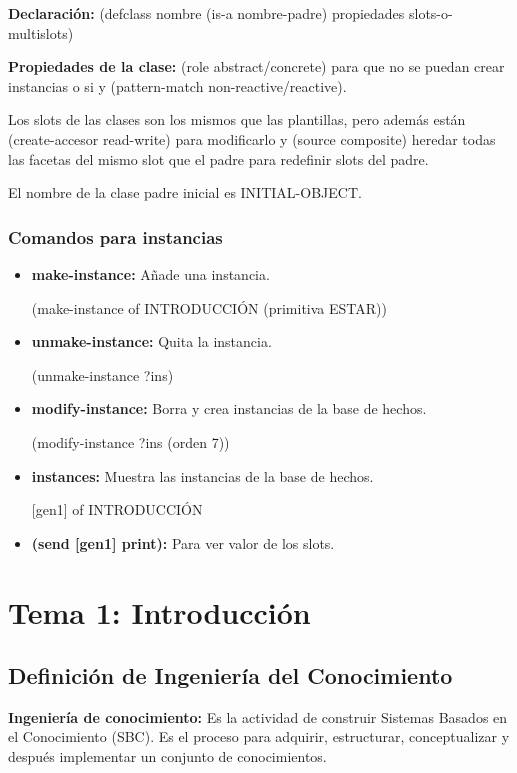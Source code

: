 \documentclass[12pt, twoside, openright]{report} %
\begin{document}
\textbf{Declaración:} (defclass nombre (is-a nombre-padre) propiedades slots-o-multislots)

\textbf{Propiedades de la clase:} (role abstract/concrete) para que no se puedan crear instancias o si y (pattern-match non-reactive/reactive).

Los slots de las clases son los mismos que las plantillas, pero además están (create-accesor read-write) para modificarlo y (source composite) heredar todas las facetas del mismo slot que el padre para redefinir slots del padre.

El nombre de la clase padre inicial es INITIAL-OBJECT.

\subsection{Comandos para instancias}
\begin{itemize}
	\item \textbf{make-instance:} Añade una instancia.
	      
	      (make-instance of INTRODUCCIÓN (primitiva ESTAR))
	\item \textbf{unmake-instance:} Quita la instancia.
	      
	      (unmake-instance ?ins)
	\item \textbf{modify-instance:} Borra y crea instancias de la base de hechos.
	      
	      (modify-instance ?ins (orden 7))
	\item \textbf{instances:} Muestra las instancias de la base de hechos.
	      
	      [gen1] of INTRODUCCIÓN
	\item \textbf{(send [gen1] print):} Para ver valor de los slots.
\end{itemize}

\chapter{Tema 1: Introducción}
\section{Definición de Ingeniería del Conocimiento}

\textbf{Ingeniería de conocimiento:} Es la actividad de construir Sistemas Basados en el Conocimiento (SBC). Es el proceso para adquirir, estructurar, conceptualizar y después implementar un conjunto de conocimientos.
\end{document}
